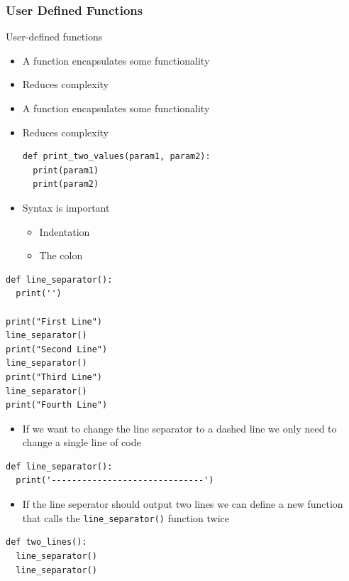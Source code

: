 \documentclass[10pt, a4paper]{beamer} %
\begin{document}
\begin{frame}\frametitle{User Defined Functions}
  \begin{block}{User-defined functions}
    \begin{itemize}
      \item A function encapsulates some functionality
      \item Reduces complexity
      \item A function encapsulates some functionality
      \item Reduces complexity
            \begin{lstlisting}
def print_two_values(param1, param2):
  print(param1)
  print(param2)
    \end{lstlisting}
      \item Syntax is important
            \begin{itemize}
              \item Indentation
              \item The colon
            \end{itemize}
    \end{itemize}
  \end{block}
  \framebreak
  \begin{examples}
    \begin{lstlisting}
def line_separator():
  print('')

print("First Line")
line_separator()
print("Second Line")
line_separator()
print("Third Line")
line_separator()
print("Fourth Line")
\end{lstlisting}
  \end{examples}
  \begin{itemize}
    \item If we want to change the line separator to a dashed line we only need to change a single line of code
  \end{itemize}
  \begin{lstlisting}
def line_separator():
  print('------------------------------')
\end{lstlisting}


  \framebreak

  \begin{examples}
    \begin{itemize}
      \item If the line seperator should output two lines we can define a new function that calls the \lstinline!line_separator()! function twice
    \end{itemize}
    \begin{lstlisting}
def two_lines():
  line_separator()
  line_separator()


\end{lstlisting}
\end{examples}
\end{frame}
\end{document}
